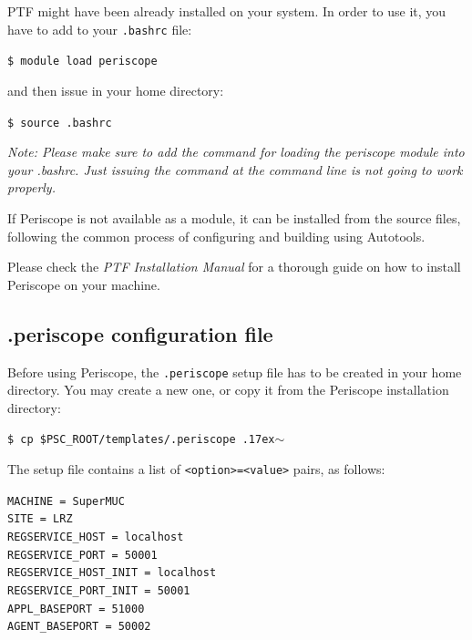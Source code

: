 \documentclass[11pt,oneside,a4paper]{book}
\newcommand{\comment}[1]{\marginpar{\scriptsize{\textcolor{red}{#1}}}}
\newcommand{\mytildett}{\raise.17ex\hbox{$\scriptstyle\mathtt{\sim}$}}
\newenvironment{code}%
{
\addtolength{\leftskip}{0.5cm}}%
{

}
\begin{document}
PTF might have been already installed on your system. In order to use it, you have to add to your \texttt{.bashrc} file:

\begin{code}
\texttt{\$ module load periscope}
\end{code}

and then issue in your home directory:

\begin{code}
\texttt{\$ source .bashrc}
\end{code}

\textit{Note: Please make sure to add the command for loading the periscope module into your .bashrc. Just issuing the command at the command line is not going to work properly.}


If Periscope is not available as a module, it can be installed from the source files, following the common process of configuring and building using Autotools.

Please check the \textit{PTF Installation Manual} for a thorough guide on how to install Periscope on your machine.

\subsection{.periscope configuration file}

Before using Periscope, the \texttt{.periscope} setup file has to be created in your home directory. You may create a new one, or copy it from the Periscope installation directory:

\begin{code}
\texttt{\$ cp \$PSC\_ROOT/templates/.periscope \mytildett}
\end{code}


The setup file contains a list of \texttt{<option>=<value>} pairs, as follows:
\comment{Update}

\begin{code}
\texttt{MACHINE = SuperMUC\\
SITE = LRZ\\
REGSERVICE\_HOST = localhost\\
REGSERVICE\_PORT = 50001\\
REGSERVICE\_HOST\_INIT = localhost\\
REGSERVICE\_PORT\_INIT = 50001\\
APPL\_BASEPORT = 51000\\
AGENT\_BASEPORT = 50002}
\end{code}
\end{document}
